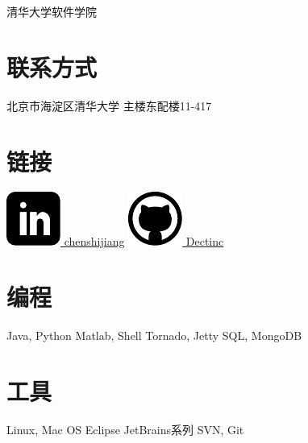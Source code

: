 \documentclass[]{friggeri-cv-cn}
\begin{document}
       {清华大学软件学院~}

\begin{aside}
  \section{联系方式}
    北京市海淀区清华大学
    主楼东配楼11-417
  \section{链接}
    \href{http://www.linkedin.com/in/chenshijiang}{\includegraphics[width=.8em]{icons/linkedin.pdf} chenshijiang}
    \href{https://github.com/Dectinc}{\includegraphics[width=.9em]{icons/github.pdf} Dectinc}
  \section{编程}
    Java, Python
    Matlab, Shell
    Tornado, Jetty
    SQL, MongoDB
  \section{工具}
    Linux, Mac OS
    Eclipse
    JetBrains系列
    SVN, Git
\end{aside}
\end{document}
